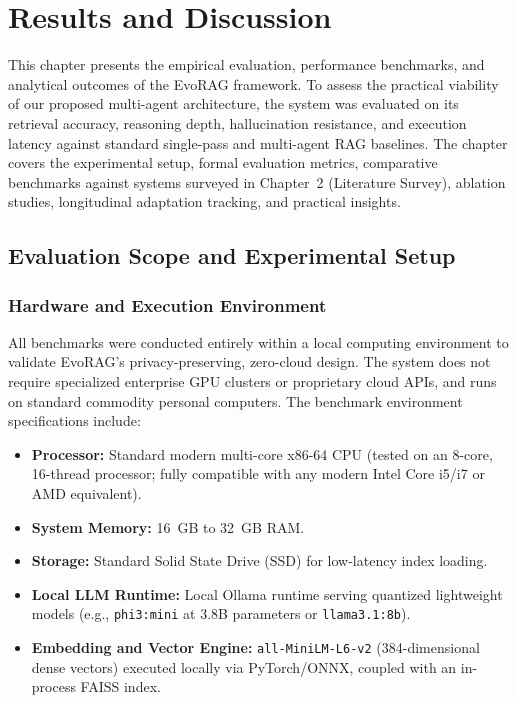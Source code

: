 \chapter{Results and Discussion}
\label{chap:results}

This chapter presents the empirical evaluation, performance benchmarks, and analytical outcomes of the EvoRAG framework. To assess the practical viability of our proposed multi-agent architecture, the system was evaluated on its retrieval accuracy, reasoning depth, hallucination resistance, and execution latency against standard single-pass and multi-agent RAG baselines. The chapter covers the experimental setup, formal evaluation metrics, comparative benchmarks against systems surveyed in Chapter~2 (Literature Survey), ablation studies, longitudinal adaptation tracking, and practical insights.

\section{Evaluation Scope and Experimental Setup}
\label{sec:eval_scope}

\subsection{Hardware and Execution Environment}
All benchmarks were conducted entirely within a local computing environment to validate EvoRAG's privacy-preserving, zero-cloud design. The system does not require specialized enterprise GPU clusters or proprietary cloud APIs, and runs on standard commodity personal computers. The benchmark environment specifications include:
\begin{itemize}
    \item \textbf{Processor:} Standard modern multi-core x86-64 CPU (tested on an 8-core, 16-thread processor; fully compatible with any modern Intel Core i5/i7 or AMD equivalent).
    \item \textbf{System Memory:} 16~GB to 32~GB RAM.
    \item \textbf{Storage:} Standard Solid State Drive (SSD) for low-latency index loading.
    \item \textbf{Local LLM Runtime:} Local Ollama runtime serving quantized lightweight models (e.g., \texttt{phi3:mini} at 3.8B parameters or \texttt{llama3.1:8b}).
    \item \textbf{Embedding and Vector Engine:} \texttt{all-MiniLM-L6-v2} (384-dimensional dense vectors) executed locally via PyTorch/ONNX, coupled with an in-process FAISS index.
\end{itemize}

